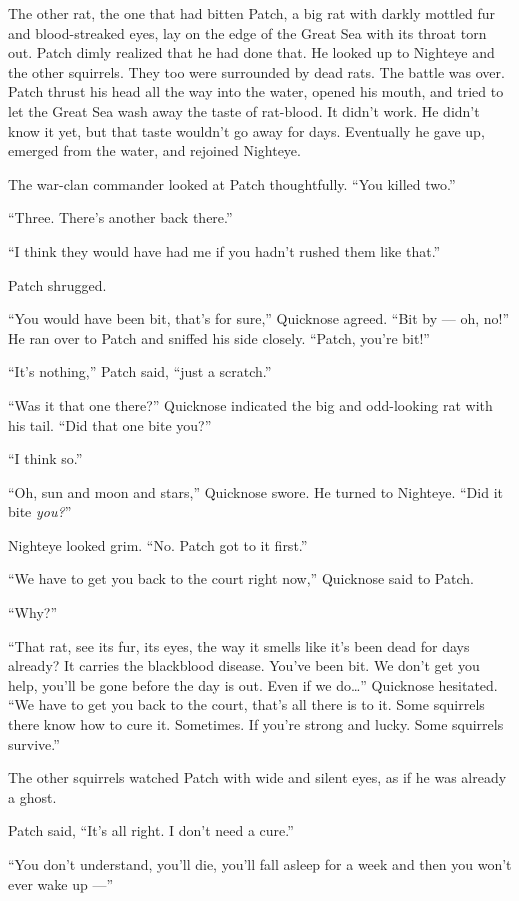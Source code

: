 \documentclass[12pt]{memoir}
\begin{document}
The other rat, the one that had bitten Patch, a big rat with darkly
mottled fur and blood-streaked eyes, lay on the edge of the Great Sea
with its throat torn out. Patch dimly realized that he had done
that. He looked up to Nighteye and the other squirrels. They too were
surrounded by dead rats. The battle was over. Patch thrust his head
all the way into the water, opened his mouth, and tried to let the
Great Sea wash away the taste of rat-blood. It didn’t work. He didn’t
know it yet, but that taste wouldn’t go away for days. Eventually he
gave up, emerged from the water, and rejoined Nighteye.

The war-clan commander looked at Patch thoughtfully. “You killed two.”

“Three. There’s another back there.”

“I think they would have had me if you hadn’t rushed them like that.”

Patch shrugged.

“You would have been bit, that’s for sure,” Quicknose agreed. “Bit by
— oh, no!” He ran over to Patch and sniffed his side closely. “Patch,
you’re bit!”

“It’s nothing,” Patch said, “just a scratch.”

“Was it that one there?” Quicknose indicated the big and odd-looking
rat with his tail. “Did that one bite you?”

“I think so.”

“Oh, sun and moon and stars,” Quicknose swore. He turned to
Nighteye. “Did it bite \textit{you?}”

Nighteye looked grim. “No. Patch got to it first.”

“We have to get you back to the court right now,” Quicknose said to
Patch.

“Why?”

“That rat, see its fur, its eyes, the way it smells like it’s been
dead for days already? It carries the blackblood disease. You’ve been
bit. We don’t get you help, you’ll be gone before the day is out. Even
if we do…” Quicknose hesitated. “We have to get you back to the court,
that’s all there is to it. Some squirrels there know how to cure
it. Sometimes. If you’re strong and lucky. Some squirrels survive.”

The other squirrels watched Patch with wide and silent eyes, as if he
was already a ghost.

Patch said, “It’s all right. I don’t need a cure.”

“You don’t understand, you’ll die, you’ll fall asleep for a week and
then you won’t ever wake up —”
\end{document}
